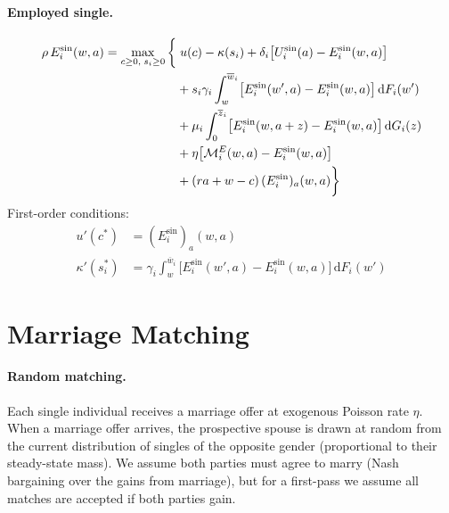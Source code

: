 \documentclass[11pt]{article}
\newcommand{\dF}{\,\mathrm{d}F}
\newcommand{\dG}{\,\mathrm{d}G}
\begin{document}
\paragraph{Employed single.}
\begin{align}
    \rho\, E_i^{\sin}(w, a) = \max_{c \geq 0,\; s_i \geq 0} \bigg\{
    &\; u(c) - \kappa(s_i)
    + \delta_i \bigl[U_i^{\sin}(a) - E_i^{\sin}(w, a)\bigr] \notag\\
    &+ s_i \gamma_i \int_w^{\overline{w}_i} \bigl[E_i^{\sin}(w', a) - E_i^{\sin}(w, a)\bigr] \dF_i(w') \notag\\
    &+ \mu_i \int_0^{\overline{z}_i} \bigl[E_i^{\sin}(w, a + z) - E_i^{\sin}(w, a)\bigr] \dG_i(z) \notag\\
    &+ \eta \bigl[\mathcal{M}_i^{E}(w, a) - E_i^{\sin}(w, a)\bigr] \notag\\
    &+ (ra + w - c)\, (E_i^{\sin})_a(w, a)
    \bigg\}
    \label{eq:HJB_Esin}
\end{align}
First-order conditions:
\begin{align}
    u'(c^*) &= (E_i^{\sin})_a(w, a) \\
    \kappa'(s_i^*) &= \gamma_i \int_w^{\overline{w}_i} \bigl[E_i^{\sin}(w', a) - E_i^{\sin}(w, a)\bigr] \dF_i(w')
\end{align}


\section{Marriage Matching}
\label{sec:matching}

\paragraph{Random matching.} Each single individual receives a marriage offer at exogenous Poisson rate $\eta$. When a marriage offer arrives, the prospective spouse is drawn at random from the current distribution of singles of the opposite gender (proportional to their steady-state mass). We assume both parties must agree to marry (Nash bargaining over the gains from marriage), but for a first-pass we assume all matches are accepted if both parties gain.
\end{document}
